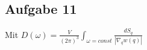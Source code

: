 \subsection*{Aufgabe 11}
Mit $D(\omega)=\frac{V}{(2\pi)^3}\int_{\omega=const} \frac{dS_q}{|\nabla_q w(q)|}$